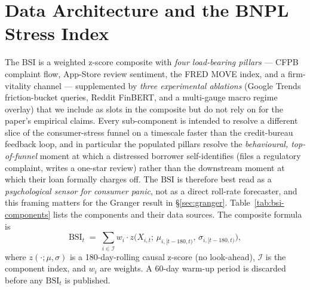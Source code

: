 \documentclass[11pt,letterpaper]{article}
\newcommand{\bsi}{\text{BSI}}
\newcommand{\z}{z}
\begin{document}
\section{Data Architecture and the BNPL Stress Index}
\label{sec:data}

The BSI is a weighted z-score composite with \emph{four load-bearing
pillars} --- CFPB complaint flow, App-Store review sentiment, the
FRED MOVE index, and a firm-vitality channel --- supplemented by
\emph{three experimental ablations} (Google Trends friction-bucket
queries, Reddit FinBERT, and a multi-gauge macro regime overlay)
that we include as slots in the composite but do not rely on for
the paper's empirical claims. Every sub-component is intended to
resolve a different slice of the consumer-stress funnel on a
timescale faster than the credit-bureau feedback loop, and in
particular the populated pillars resolve the
\emph{behavioural, top-of-funnel} moment at which a distressed
borrower self-identifies (files a regulatory complaint, writes a
one-star review) rather than the downstream moment at which their
loan formally charges off. The $\bsi$ is therefore best read as a
\emph{psychological sensor for consumer panic}, not as a direct
roll-rate forecaster, and this framing matters for the Granger
result in \S\ref{sec:granger}. Table~\ref{tab:bsi-components} lists
the components and their data sources. The composite formula is
%
\begin{equation}
\bsi_t
\;=\;
\sum_{i \in \mathcal{I}} w_i \cdot \z\!\big(X_{i,t};\, \mu_{i,[t-180,t)},
\,\sigma_{i,[t-180,t)}\big),
\label{eq:bsi}
\end{equation}
%
where $\z(\cdot;\mu,\sigma)$ is a 180-day-rolling causal z-score (no
look-ahead), $\mathcal{I}$ is the component index, and $w_i$ are weights.
A 60-day warm-up period is discarded before any $\bsi_t$ is published.
\end{document}
